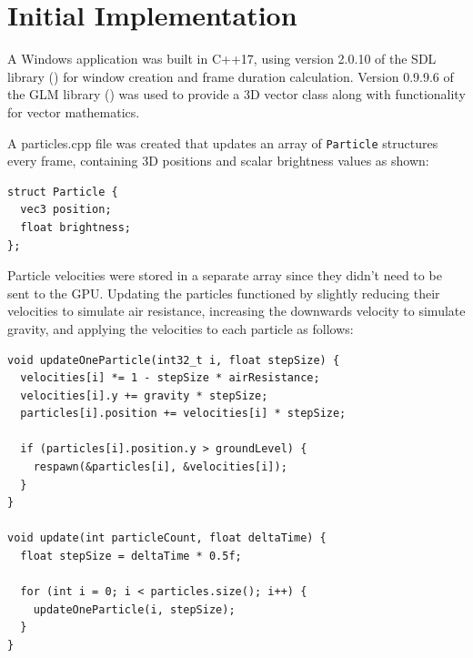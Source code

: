 \documentclass[11pt, a4paper, twocolumn]{article}
\begin{document}


\section{Initial Implementation}



A Windows application was built in C++17, using version 2.0.10 of the SDL library (\citeyear{SDL2}) for window creation and frame duration calculation. Version 0.9.9.6 of the GLM library (\citeyear{GLM}) was used to provide a 3D vector class along with functionality for vector mathematics.

A particles.cpp file was created that updates an array of \verb|Particle| structures every frame, containing 3D positions and scalar brightness values as shown:

\begin{verbatim}
struct Particle {
  vec3 position;
  float brightness;
};
\end{verbatim}

Particle velocities were stored in a separate array since they didn't need to be sent to the GPU. Updating the particles functioned by slightly reducing their velocities to simulate air resistance, increasing the downwards velocity to simulate gravity, and applying the velocities to each particle as follows:

\begin{verbatim}
void updateOneParticle(int32_t i, float stepSize) {
  velocities[i] *= 1 - stepSize * airResistance;
  velocities[i].y += gravity * stepSize;
  particles[i].position += velocities[i] * stepSize;

  if (particles[i].position.y > groundLevel) {
    respawn(&particles[i], &velocities[i]);
  }
}

void update(int particleCount, float deltaTime) {
  float stepSize = deltaTime * 0.5f;

  for (int i = 0; i < particles.size(); i++) {
    updateOneParticle(i, stepSize);
  }
}
\end{verbatim}
\end{document}
